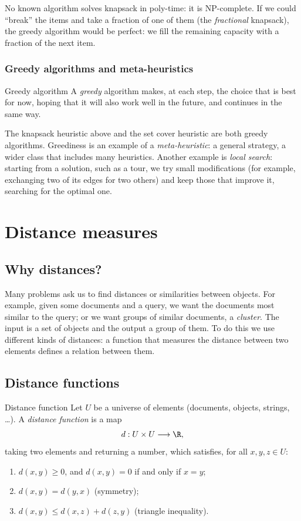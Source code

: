 \documentclass[a4paper,12pt,oneside]{report}
\begin{document}
No known algorithm solves knapsack in poly-time: it is NP-complete. If
we could ``break'' the items and take a fraction of one of them (the
\emph{fractional} knapsack), the greedy algorithm would be perfect: we
fill the remaining capacity with a fraction of the next item.

\subsection{Greedy algorithms and meta-heuristics}

\begin{frameddefn}{Greedy algorithm}\label{def:greedy}
A \emph{greedy} algorithm makes, at each step, the choice that is best
for now, hoping that it will also work well in the future, and
continues in the same way.
\end{frameddefn}

The knapsack heuristic above and the set cover heuristic are both
greedy algorithms. Greediness is an example of a \emph{meta-heuristic}:
a general strategy, a wider class that includes many heuristics.
Another example is \emph{local search}: starting from a solution, such
as a tour, we try small modifications (for example, exchanging two of
its edges for two others) and keep those that improve it, searching
for the optimal one.

\chapter{Distance measures}

\section{Why distances?}

Many problems ask us to find distances or similarities between
objects. For example, given some documents and a query, we want the
documents most similar to the query; or we want groups of similar
documents, a \emph{cluster}. The input is a set of objects and the
output a group of them. To do this we use different kinds of
distances: a function that measures the distance between two elements
defines a relation between them.

\section{Distance functions}

\begin{frameddefn}{Distance function}\label{def:distance}
Let $U$ be a universe of elements (documents, objects, strings, \ldots).
A \emph{distance function} is a map
\[
  d:U\times U\longrightarrow\R,
\]
taking two elements and returning a number, which satisfies, for all
$x,y,z\in U$:
\begin{enumerate}
  \item $d(x,y)\geq0$, and $d(x,y)=0$ if and only if $x=y$;
  \item $d(x,y)=d(y,x)$ (symmetry);
  \item $d(x,y)\leq d(x,z)+d(z,y)$ (triangle inequality).
\end{enumerate}
\end{frameddefn}
\end{document}
